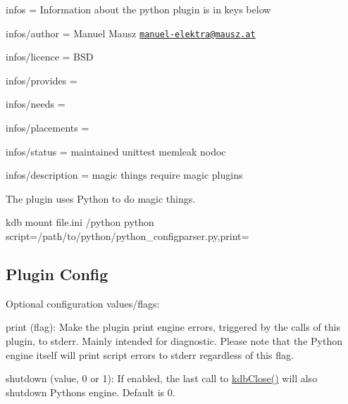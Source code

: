 
\begin{DoxyItemize}
\item infos = Information about the python plugin is in keys below
\item infos/author = Manuel Mausz \href{mailto:manuel-elektra@mausz.at}{\tt manuel-\/elektra@mausz.\+at}
\item infos/licence = B\+S\+D
\item infos/provides =
\item infos/needs =
\item infos/placements =
\item infos/status = maintained unittest memleak nodoc
\item infos/description = magic things require magic plugins
\end{DoxyItemize}

The plugin uses Python to do magic things.

\begin{DoxyVerb}kdb mount file.ini /python python script=/path/to/python/python_configparser.py,print=
\end{DoxyVerb}


\subsection*{Plugin Config}

Optional configuration values/flags\+:


\begin{DoxyItemize}
\item print (flag)\+: Make the plugin print engine errors, triggered by the calls of this plugin, to stderr. Mainly intended for diagnostic. Please note that the Python engine itself will print script errors to stderr regardless of this flag.
\item shutdown (value, 0 or 1)\+: If enabled, the last call to {\ttfamily \hyperlink{group__kdb_gadb54dc9fda17ee07deb9444df745c96f}{kdb\+Close()}} will also shutdown Pythons engine. Default is 0. 
\end{DoxyItemize}